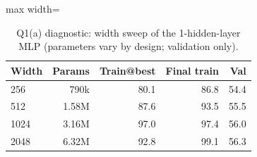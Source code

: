 \begin{table}[t]
\centering
\footnotesize
\setlength{\tabcolsep}{3.5pt}
\begin{adjustbox}{max width=\linewidth}
\begin{tabular}{lrrrr}
\toprule
Width & Params & Train@best & Final train & Val \\
\midrule
256 & 790k & 80.1 & 86.8 & 54.4 \\
512 & 1.58M & 87.6 & 93.5 & 55.5 \\
1024 & 3.16M & 97.0 & 97.4 & 56.0 \\
2048 & 6.32M & 92.8 & 99.1 & 56.3 \\
\bottomrule
\end{tabular}
\end{adjustbox}
\caption{Q1(a) diagnostic: width sweep of the 1-hidden-layer MLP (parameters vary by design; validation only).}
\label{tab:q1cap}
\end{table}
